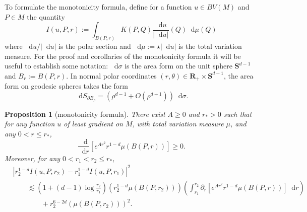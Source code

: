 \documentclass[reqno,11pt]{amsart}
\newcommand{\RR}{\mathbf{R}}
\newcommand{\Sph}{\mathbf S}
\newcommand*\dif{\mathop{}\!\mathrm{d}}
\newtheorem{proposition}[theorem]{Proposition}
\theoremstyle{definition}
\numberwithin{equation}{section}
\begin{document}
To formulate the monotonicity formula, define for a function $u \in BV(M)$ and $P \in M$ the quantity
\begin{equation}\label{integral of du}
I(u, P, r) := \int_{B(P, r)} K(P, Q) \frac{\dif u}{|\dif u|}(Q) \dif \mu(Q)
\end{equation}
where $\dif u/|\dif u|$ is the polar section and $\dif \mu := \star|\dif u|$ is the total variation measure.
For the proof and corollaries of the monotonicity formula it will be useful to establish some notation: $\dif \sigma$ is the area form on the unit sphere $\Sph^{d - 1}$ and $B_r := B(P, r)$.
In normal polar coordinates $(r, \theta) \in \RR_+ \times \Sph^{d - 1}$, the area form on geodesic spheres takes the form 
\begin{equation}\label{geodesic spheres area form}
\dif S_{\partial B_\rho} = (\rho^{d - 1} + O(\rho^{d + 1})) \dif \sigma.
\end{equation}

\begin{proposition}[monotonicity formula]\label{Monotone}
There exist $A \geq 0$ and $r_* > 0$ such that for any function $u$ of least gradient on $M$, with total variation measure $\mu$, and any $0 < r \leq r_*$,
\begin{equation}\label{weak monotonicity}
\frac{\dif}{\dif r}\left[e^{Ar^2}r^{1 - d} \mu(B(P, r))\right] \geq 0.
\end{equation}
Moreover, for any $0 < r_1 < r_2 \leq r_*$,
\begin{align*}
&|r_2^{1 - d} I(u, P, r_2) - r_1^{1 - d} I(u, P, r_1)|^2 \\
&\qquad \lesssim \left(1 + (d - 1) \log \frac{r_2}{r_1}\right) \left(r_2^{1 - d}\mu(B(P, r_2)) \right)
\left(\int_{r_1}^{r_2} \partial_r \left[e^{Ar^2} r^{1 - d} \mu(B(P, r))\right] \dif r\right)\\
&\qquad \qquad + r_2^{6-2d} \left(\mu(B(P, r_2))\right)^2.
\end{align*}
\end{proposition}
\end{document}
